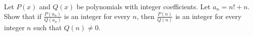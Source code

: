 Let $P(x)$ and $Q(x)$ be polynomials with integer coefficients. Let $a_n = n! +n$. Show that if $\frac{P(a_n)}{Q(a_n)}$ is an integer for every $n$,  then $\frac{P(n)}{Q(n)}$ is an integer for every integer $n$ such that $Q(n)\neq 0$.